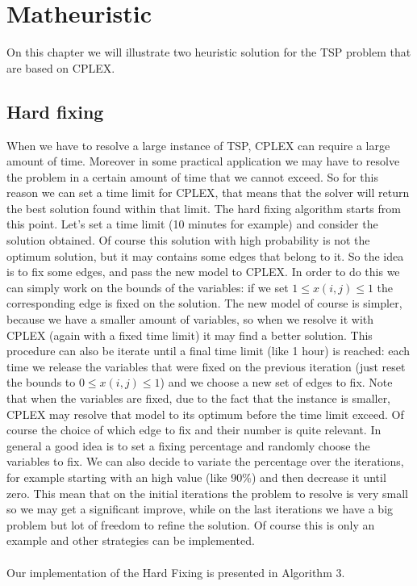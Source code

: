 \chapter{Matheuristic}
On this chapter we will illustrate two heuristic solution for the TSP problem that are based on CPLEX.

\section{Hard fixing}
When we have to resolve a large instance of TSP, CPLEX can require a large amount of time. Moreover in some practical application we may have to resolve the problem in a certain amount of time that we cannot exceed. So for this reason we can set a time limit for CPLEX, that means that the solver will return the best solution found within that limit. The hard fixing algorithm starts from this point. Let's set a time limit (10 minutes for example) and consider the solution obtained. Of course this solution with high probability is not the optimum solution, but it may contains some edges that belong to it. So the idea is to fix some edges, and pass the new model to CPLEX. In order to do this we can simply work on the bounds of the variables: if we set $1 \leq x(i,j) \leq 1$ the corresponding edge is fixed on the solution. The new model of course is simpler, because we have a smaller amount of variables, so when we resolve it with CPLEX (again with a fixed time limit) it may find a better solution. This procedure can also be iterate until a final time limit (like 1 hour) is reached: each time we release the variables that were fixed on the previous iteration (just reset the bounds to $0 \leq x(i,j) \leq 1$) and we choose a new set of edges to fix.
Note that when the variables are fixed, due to the fact that the instance is smaller, CPLEX may resolve that model to its optimum before the time limit exceed.
Of course the choice of which edge to fix and their number is quite relevant. In general a good idea is to set a fixing percentage and randomly choose the variables to fix. We can also decide to variate the percentage over the iterations, for example starting with an high value (like 90\%) and then decrease it until zero. This mean that on the initial iterations the problem to resolve is very small so we may get a significant improve, while on the last iterations we have a big problem but lot of freedom to refine the solution. Of course this is only an example and other strategies can be implemented.  
\\\\ Our implementation of the Hard Fixing is presented in Algorithm 3. 
